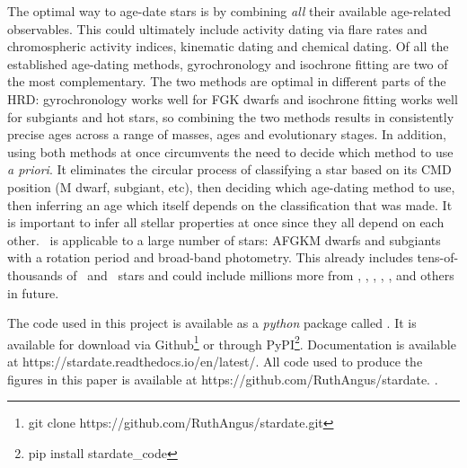 The optimal way to age-date stars is by combining {\it all} their available
age-related observables.
This could ultimately include activity dating via flare rates and
chromospheric activity indices, kinematic dating and chemical dating.
Of all the established age-dating methods, gyrochronology and isochrone
fitting are two of the most complementary.
The two methods are optimal in different parts of the HRD:
gyrochronology works well for FGK dwarfs and isochrone fitting works well for
subgiants and hot stars, so combining the two methods results in consistently
precise ages across a range of masses, ages and evolutionary stages.
In addition, using both methods at once circumvents the need to decide which
method to use {\it a priori}.
It eliminates the circular process of classifying a star based on its CMD
position (M dwarf, subgiant, etc), then deciding which age-dating method to
use, then inferring an age which itself depends on the classification that was
made.
It is important to infer all stellar properties at once since they all depend
on each other.
\sd\ is applicable to a large number of stars: AFGKM dwarfs and subgiants with
a rotation period and broad-band photometry.
This already includes tens-of-thousands of \kepler\ and \ktwo\ stars and could
include millions more from \tess, \lsst, \wfirst, \plato, \gaia, and others in
future.

The code used in this project is available as a {\it python} package called
\sd.
It is available for download via Github\footnote{git clone
https://github.com/RuthAngus/stardate.git} or through
PyPI\footnote{pip install stardate\_code}.
Documentation is available at https://stardate.readthedocs.io/en/latest/.
All code used to produce the figures in this paper is available at
https://github.com/RuthAngus/stardate.
.
